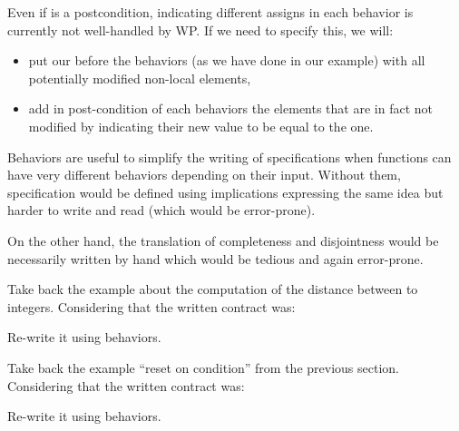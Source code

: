 \begin{Warning}
  Even if  is a postcondition, indicating different assigns
  in each behavior is currently not well-handled by WP. If we need to specify
  this, we will:
  \begin{itemize}
  \item put our  before the behaviors (as we have done in our
    example) with all potentially modified non-local elements,
  \item add in post-condition of each behaviors the elements that are in fact
    not modified by indicating their new value to be equal to the
     one.
  \end{itemize}
\end{Warning}


Behaviors are useful to simplify the writing of specifications when
functions can have very different behaviors depending on their input.
Without them, specification would be defined using implications
expressing the same idea but harder to write and read (which would be
error-prone).



On the other hand, the translation of completeness and disjointness
would be necessarily written by hand which would be tedious and again
error-prone.








Take back the example about the computation of the distance between to
integers. Considering that the written contract was:




Re-write it using behaviors.






Take back the example ``reset on condition'' from the previous section.
Considering that the written contract was:






Re-write it using behaviors.






